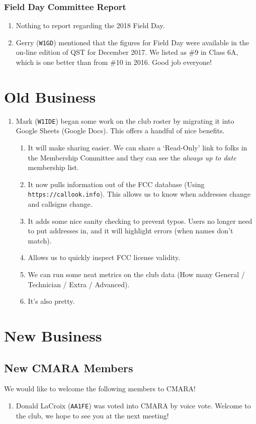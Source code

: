 \documentclass[10pt,letterpaper]{article}
\begin{document}
\subsubsection{Field Day Committee Report}
\begin{enumerate}
  \item Nothing to report regarding the 2018 Field Day.
  \item Gerry (\texttt{W1GD}) mentioned that the figures for Field Day were available in the on-line edition of QST for December 2017. We listed as \#9 in Class 6A, which is one better than from \#10 in 2016. Good job everyone!
\end{enumerate}

\section{Old Business}
\begin{enumerate}
  \item Mark (\texttt{W1IDE}) began some work on the club roster by migrating it into Google Sheets (Google Docs). This offers a handful of nice benefits.
  \begin{enumerate}
    \item It will make sharing easier. We can share a `Read-Only' link to folks in the Membership Committee and they can see the \emph{always up to date} membership list.
    \item It now pulls information out of the FCC database (Using \texttt{https://callook.info}). This allows us to know when addresses change and callsigns change.
    \item It adds some nice sanity checking to prevent typos. Users no longer need to put addresses in, and it will highlight errors (when names don't match).
    \item Allows us to quickly inspect FCC license validity.
    \item We can run some neat metrics on the club data (How many General / Technician / Extra / Advanced).
    \item It's also pretty.
  \end{enumerate}
\end{enumerate}

\section{New Business}

\subsection{New CMARA Members}
\label{new-cmara-members}
We would like to welcome the following members to CMARA!
\begin{enumerate}
  \item Donald LaCroix (\texttt{AA1FE}) was voted into CMARA by voice vote. Welcome to the club, we hope to see you at the next meeting!
\end{enumerate}
\end{document}
